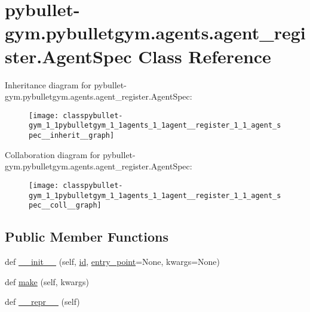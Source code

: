 \hypertarget{classpybullet-gym_1_1pybulletgym_1_1agents_1_1agent__register_1_1_agent_spec}{}\section{pybullet-\/gym.pybulletgym.\+agents.\+agent\+\_\+register.\+Agent\+Spec Class Reference}
\label{classpybullet-gym_1_1pybulletgym_1_1agents_1_1agent__register_1_1_agent_spec}


Inheritance diagram for pybullet-\/gym.pybulletgym.\+agents.\+agent\+\_\+register.\+Agent\+Spec\+:
\nopagebreak
\begin{figure}[H]
\begin{center}
\leavevmode
\texttt{[image: classpybullet-gym\_1\_1pybulletgym\_1\_1agents\_1\_1agent\_\_register\_1\_1\_agent\_spec\_\_inherit\_\_graph]}
\end{center}
\end{figure}


Collaboration diagram for pybullet-\/gym.pybulletgym.\+agents.\+agent\+\_\+register.\+Agent\+Spec\+:
\nopagebreak
\begin{figure}[H]
\begin{center}
\leavevmode
\texttt{[image: classpybullet-gym\_1\_1pybulletgym\_1\_1agents\_1\_1agent\_\_register\_1\_1\_agent\_spec\_\_coll\_\_graph]}
\end{center}
\end{figure}
\subsection*{Public Member Functions}
\begin{DoxyCompactItemize}
\item 
def \hyperlink{classpybullet-gym_1_1pybulletgym_1_1agents_1_1agent__register_1_1_agent_spec_a37f4b9a4f845e4ec45d86025954f17ae}{\+\_\+\+\_\+init\+\_\+\+\_\+} (self, \hyperlink{classpybullet-gym_1_1pybulletgym_1_1agents_1_1agent__register_1_1_agent_spec_ac2ec74e88af7e0f3ee2151cb06b46897}{id}, \hyperlink{namespacepybullet-gym_1_1pybulletgym_1_1agents_a21dc32ada053ca5c8d9fece96bff7091}{entry\+\_\+point}=None, kwargs=None)
\item 
def \hyperlink{classpybullet-gym_1_1pybulletgym_1_1agents_1_1agent__register_1_1_agent_spec_aac02f9a3c4e4ecc8961e0efb584c1971}{make} (self, kwargs)
\item 
def \hyperlink{classpybullet-gym_1_1pybulletgym_1_1agents_1_1agent__register_1_1_agent_spec_a619421eb8e42202781be28f1f634a79d}{\+\_\+\+\_\+repr\+\_\+\+\_\+} (self)
\end{DoxyCompactItemize}
